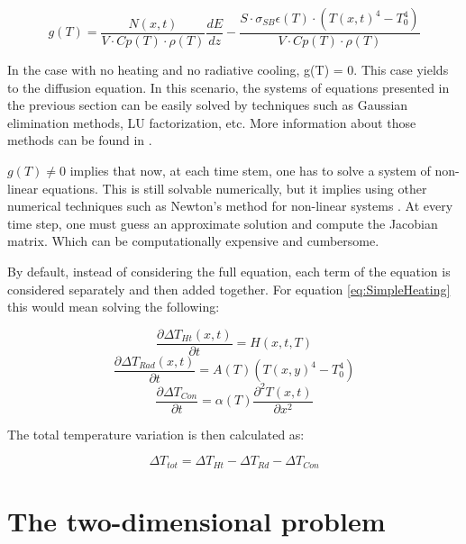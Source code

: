 \begin{equation}
    g(T) = \frac{N(x,t)}{V\cdot Cp(T)\cdot \rho(T)}\frac{dE}{dz} - \frac{S\cdot \sigma_{SB}\epsilon(T)\cdot \left( T(x,t)^4 - T_0^4\right)}{V\cdot Cp(T)\cdot \rho(T)}
\end{equation}

In the case with no heating and no radiative cooling, g(T) = 0. This case yields to the diffusion equation. In this scenario, the systems of equations presented in the previous section can be easily solved by techniques such as Gaussian elimination methods, LU factorization, etc. More information about those methods can be found in \parencite[][]{ref:AlvaroBook}. 

$g(T) \neq 0$ implies that now, at each time stem, one has to solve a system of non-linear equations. This is still solvable numerically, but it implies using other numerical techniques such as Newton's method for non-linear systems \parencite[][]{ref:AlvaroBook}. At every time step, one must guess an approximate solution and compute the Jacobian matrix. Which can be computationally expensive and cumbersome. 

By default, instead of considering the full equation, each term of the equation is considered separately and then added together. For equation \ref{eq:SimpleHeating} this would mean solving the following: 

\begin{equation}
    \frac{\partial \Delta T_{Ht} (x,t)}{\partial t} = H(x,t,T)
\end{equation}
\begin{equation}
    \frac{\partial \Delta T_{Rad} (x,t)}{\partial t} = A(T) \left(T(x,y)^4 - T_0^4\right)
\end{equation}
\begin{equation}
    \frac{\partial \Delta T_{Con}}{\partial t} = \alpha(T)\frac{\partial^2 T(x,t)}{\partial x^2}
\end{equation}

The total temperature variation is then calculated as: 

\begin{equation}
    \Delta T_{tot} = \Delta T_{Ht} - \Delta T_{Rd} - \Delta T_{Con}
\end{equation}


\section{The two-dimensional problem}

